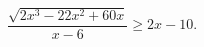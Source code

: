 \begin{ex}[type=inequality]
	\begin{condition}
		$ \dfrac{\sqrt{2x^3 - 22x^2 + 60x}}{x - 6}\geqslant2x - 10.$
	\end{condition}
\end{ex}